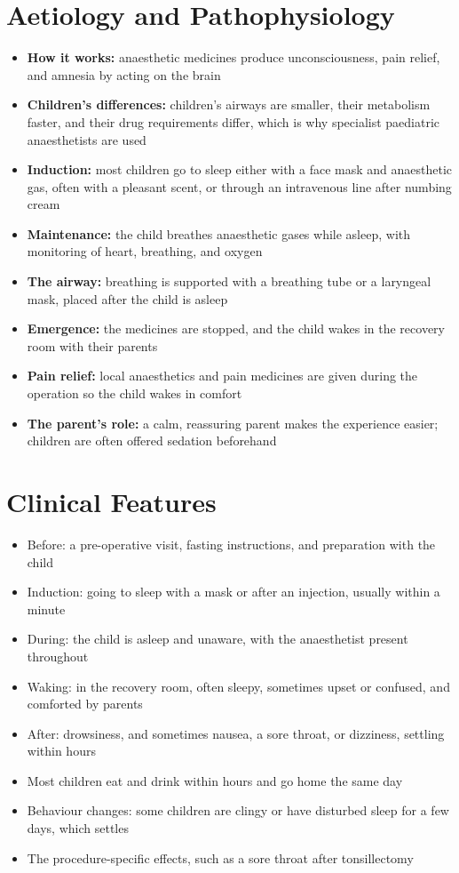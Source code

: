 \section*{Aetiology and Pathophysiology}
\begin{itemize}
    \item \textbf{How it works:} anaesthetic medicines produce unconsciousness, pain relief, and amnesia by acting on the brain
    \item \textbf{Children's differences:} children's airways are smaller, their metabolism faster, and their drug requirements differ, which is why specialist paediatric anaesthetists are used
    \item \textbf{Induction:} most children go to sleep either with a face mask and anaesthetic gas, often with a pleasant scent, or through an intravenous line after numbing cream
    \item \textbf{Maintenance:} the child breathes anaesthetic gases while asleep, with monitoring of heart, breathing, and oxygen
    \item \textbf{The airway:} breathing is supported with a breathing tube or a laryngeal mask, placed after the child is asleep
    \item \textbf{Emergence:} the medicines are stopped, and the child wakes in the recovery room with their parents
    \item \textbf{Pain relief:} local anaesthetics and pain medicines are given during the operation so the child wakes in comfort
    \item \textbf{The parent's role:} a calm, reassuring parent makes the experience easier; children are often offered sedation beforehand
\end{itemize}

\section*{Clinical Features}
\begin{itemize}
    \item Before: a pre-operative visit, fasting instructions, and preparation with the child
    \item Induction: going to sleep with a mask or after an injection, usually within a minute
    \item During: the child is asleep and unaware, with the anaesthetist present throughout
    \item Waking: in the recovery room, often sleepy, sometimes upset or confused, and comforted by parents
    \item After: drowsiness, and sometimes nausea, a sore throat, or dizziness, settling within hours
    \item Most children eat and drink within hours and go home the same day
    \item Behaviour changes: some children are clingy or have disturbed sleep for a few days, which settles
    \item The procedure-specific effects, such as a sore throat after tonsillectomy
\end{itemize}

